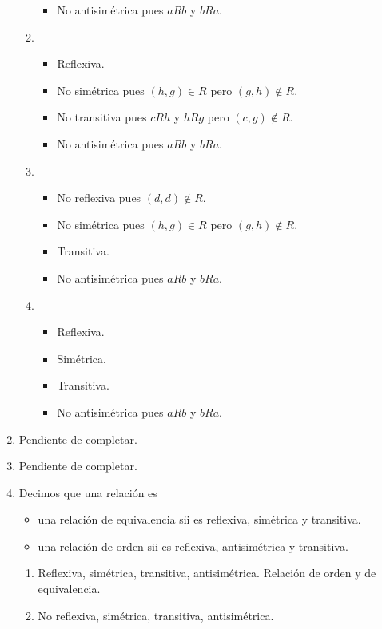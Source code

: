 \begin{enumerate}
\begin{enumerate}
\begin{itemize}
      \item No antisimétrica pues $a R b$ y $b R a$.
    \end{itemize}
  \item
    \begin{itemize}
      \item Reflexiva.
      \item No simétrica pues $(h,g) \in R$ pero $(g,h) \notin R$.
      \item No transitiva pues $c R h$ y $h R g$ pero $(c,g) \notin R$.
      \item No antisimétrica pues $a R b$ y $b R a$.
    \end{itemize}
  \item
    \begin{itemize}
      \item No reflexiva pues $(d,d) \notin R$.
      \item No simétrica pues $(h,g) \in R$ pero $(g,h) \notin R$.
      \item Transitiva.
      \item No antisimétrica pues $a R b$ y $b R a$.
    \end{itemize}
  \item
    \begin{itemize}
      \item Reflexiva.
      \item Simétrica.
      \item Transitiva.
      \item No antisimétrica pues $a R b$ y $b R a$.
    \end{itemize}
  \end{enumerate}
\item %
  Pendiente de completar.
\item %
  Pendiente de completar.
\item %
  Decimos que una relación es
  \begin{itemize}
  \item una relación de equivalencia sii es reflexiva, simétrica y transitiva.
  \item una relación de orden sii es reflexiva, antisimétrica y transitiva.
  \end{itemize}
  \begin{enumerate}
  \item Reflexiva, simétrica, transitiva, antisimétrica. Relación de orden y de equivalencia.
  \item No reflexiva, simétrica, transitiva, antisimétrica.

\end{enumerate}
\end{enumerate}
